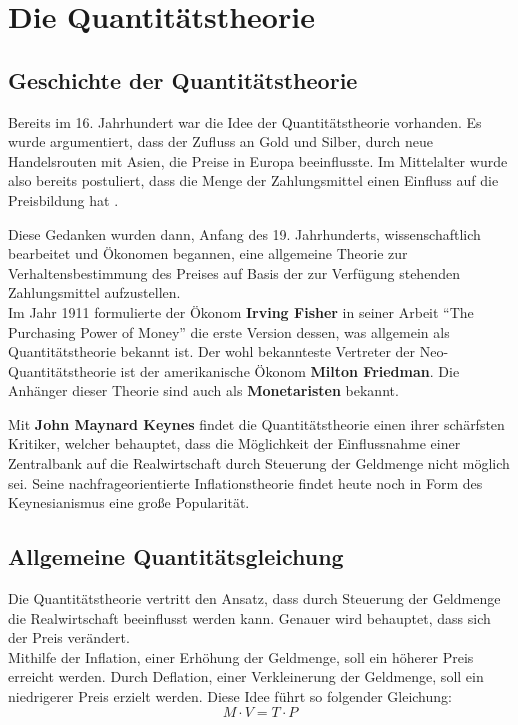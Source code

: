 \chapter{Die Quantitätstheorie}

\section{Geschichte der Quantitätstheorie}
Bereits im 16. Jahrhundert war die Idee der Quantitätstheorie vorhanden. Es wurde argumentiert, dass der Zufluss an Gold und Silber, durch neue Handelsrouten mit Asien, die Preise in Europa beeinflusste. Im Mittelalter wurde also bereits postuliert, dass die Menge der Zahlungsmittel einen Einfluss auf die Preisbildung hat \autocite{Woll1977}.

Diese Gedanken wurden dann, Anfang des 19. Jahrhunderts, wissenschaftlich bearbeitet und Ökonomen begannen, eine allgemeine Theorie zur Verhaltensbestimmung des Preises auf Basis der zur Verfügung stehenden Zahlungsmittel aufzustellen.\\
Im Jahr 1911 formulierte der Ökonom \textbf{Irving Fisher} in seiner Arbeit \enquote{The Purchasing Power of Money} die erste Version dessen, was allgemein als Quantitätstheorie bekannt ist. Der wohl bekannteste Vertreter der Neo-Quantitätstheorie ist der amerikanische Ökonom \textbf{Milton Friedman}. Die Anhänger dieser Theorie sind auch als \textbf{Monetaristen} bekannt.

Mit \textbf{John Maynard Keynes} findet die Quantitätstheorie einen ihrer schärfsten Kritiker, welcher behauptet, dass die Möglichkeit der Einflussnahme einer Zentralbank auf die Realwirtschaft durch Steuerung der Geldmenge nicht möglich sei. Seine nachfrageorientierte Inflationstheorie findet heute noch in Form des Keynesianismus eine große Popularität.

\section{Allgemeine Quantitätsgleichung}

Die Quantitätstheorie vertritt den Ansatz, dass durch Steuerung der Geldmenge die Realwirtschaft beeinflusst werden kann. Genauer wird behauptet, dass sich der Preis verändert. \\
Mithilfe der Inflation, einer Erhöhung der Geldmenge, soll ein höherer Preis erreicht werden. Durch Deflation, einer Verkleinerung der Geldmenge, soll ein niedrigerer Preis erzielt werden. Diese Idee führt so folgender Gleichung:
\begin{equation}
    \tag{Allg. Quantitätsgleichung}
    M \cdot V = T \cdot P
\end{equation}\label{allg. Q-Formel}


